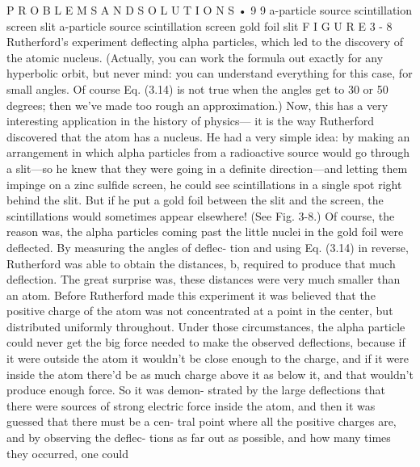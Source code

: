 \documentclass[10pt,oneside]{article}
\begin{document}
P R O B L E M S  A N D  S O L U T I O N S • 9 9 a-particle source scintillation screen slit a-particle source scintillation screen gold foil slit F I G U R E  3 - 8 Rutherford’s experiment deflecting alpha particles, which led to the discovery of the atomic nucleus. (Actually, you can work the formula out exactly for any hyperbolic orbit, but never mind: you can understand everything for this case, for small angles. Of course Eq. (3.14) is not true when the angles get to 30 or 50 degrees; then we’ve made too rough an approximation.) Now, this has a very interesting application in the history of physics--- it is the way Rutherford discovered that the atom has a nucleus. He had a very simple idea: by making an arrangement in which alpha particles from a radioactive source would go through a slit---so he knew that they were going in a definite direction---and letting them impinge on a zinc sulfide screen, he could see scintillations in a single spot right behind the slit. But if he put a gold foil between the slit and the screen, the scintillations would sometimes appear elsewhere! (See Fig. 3-8.) Of course, the reason was, the alpha particles coming past the little nuclei in the gold foil were deflected. By measuring the angles of deflec- tion and using Eq. (3.14) in reverse, Rutherford was able to obtain the distances, b, required to produce that much deflection. The great surprise was, these distances were very much smaller than an atom. Before Rutherford made this experiment it was believed that the positive charge of the atom was not concentrated at a point in the center, but distributed uniformly throughout. Under those circumstances, the alpha particle could never get the big force needed to make the observed deflections, because if it were outside the atom it wouldn’t be close enough to the charge, and if it were inside the atom there’d be as much charge above it as below it, and that wouldn’t produce enough force. So it was demon- strated by the large deflections that there were sources of strong electric force inside the atom, and then it was guessed that there must be a cen- tral point where all the positive charges are, and by observing the deflec- tions as far out as possible, and how many times they occurred, one could\par
\end{document}
